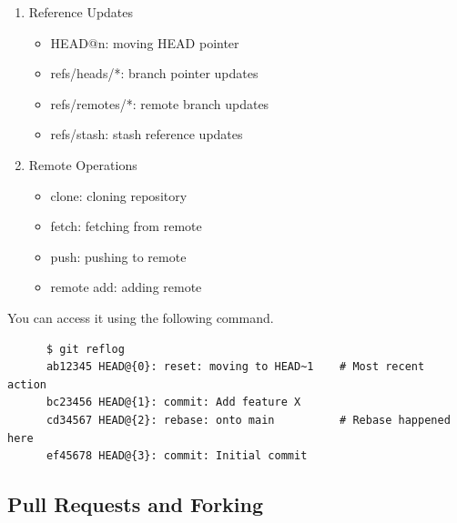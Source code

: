 \begin{definition}[Reflog]
\begin{enumerate}
      \item Reference Updates
        \begin{itemize}
          \item HEAD@{n}: moving HEAD pointer
          \item refs/heads/*: branch pointer updates
          \item refs/remotes/*: remote branch updates
          \item refs/stash: stash reference updates
        \end{itemize}

      \item Remote Operations
        \begin{itemize}
          \item clone: cloning repository
          \item fetch: fetching from remote
          \item push: pushing to remote
          \item remote add: adding remote
        \end{itemize}
    \end{enumerate}
    You can access it using the following command. 
    \begin{lstlisting}
      $ git reflog
      ab12345 HEAD@{0}: reset: moving to HEAD~1    # Most recent action
      bc23456 HEAD@{1}: commit: Add feature X 
      cd34567 HEAD@{2}: rebase: onto main          # Rebase happened here
      ef45678 HEAD@{3}: commit: Initial commit
    \end{lstlisting}
  \end{definition}

\subsection{Pull Requests and Forking} 


